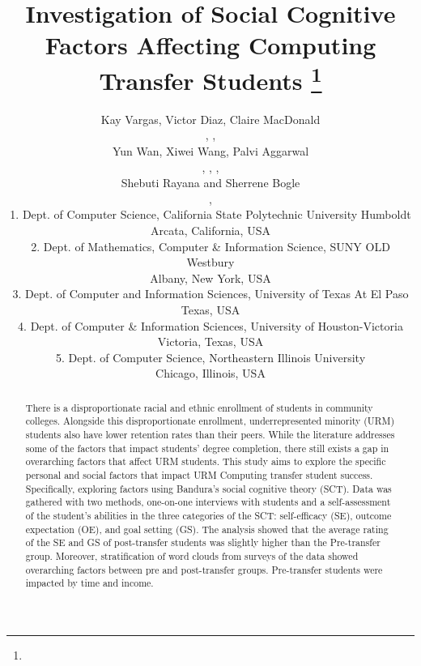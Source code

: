 \documentclass{article}
\title{Investigation of Social Cognitive Factors Affecting Computing Transfer Students
\footnote{\protect}
}
\author{
Kay Vargas\affmark[1],  Victor Diaz\affmark[1],  Claire MacDonald \affmark[3] \\
\email{kv111@humboldt.edu}, \email{vmd21@humboldt.edu}, \email{cemacdonald2@miners.utep.edu}\\
 Yun Wan\affmark[4], Xiwei Wang\affmark[5], Palvi Aggarwal\affmark[3] \\
\email{wany@uhv.edu}, \email{xwang9@neiu.edu}, \email{paggarwal@utep.edu}, \\
 Shebuti Rayana \affmark[2] and Sherrene Bogle \affmark[1]\\ 
\email{rayanas@oldwestbury.edu}, \email{sab30@humboldt.edu}\\
\scriptsize 1. Dept. of Computer Science, 
California State Polytechnic University Humboldt \\ \scriptsize Arcata, California, USA\\
 \scriptsize 2.  Dept. of Mathematics, Computer \& Information Science, SUNY OLD Westbury \\ \scriptsize Albany, New York, USA
 \\
\scriptsize 3. Dept. of Computer and Information Sciences, University of Texas At El Paso \\
\scriptsize Texas, USA\\
\scriptsize 4. Dept. of Computer \& Information Sciences, University of Houston-Victoria \\ 
\scriptsize Victoria, Texas, USA \\
\scriptsize 5. Dept. of Computer Science, Northeastern Illinois University \\
\scriptsize Chicago, Illinois, USA
}
\begin{document}
\maketitle
\begin{abstract}
 There is a disproportionate racial and ethnic enrollment of students in community colleges. %
 Alongside this disproportionate enrollment, underrepresented minority (URM) students also have lower retention rates than their peers. While the literature addresses some of the factors that impact students' degree completion, there still exists a gap in overarching factors that affect URM students. This study aims to explore the specific personal and social factors that impact URM Computing transfer student success. Specifically, exploring factors using Bandura's social cognitive theory (SCT). %
Data was gathered with two methods, one-on-one interviews with students and a self-assessment of the student's abilities in the three categories of the SCT: self-efficacy (SE), outcome expectation (OE), and goal setting (GS). The analysis showed that the average rating of the SE and GS of post-transfer students was slightly higher than the Pre-transfer group. Moreover, stratification of word clouds from surveys of the data showed overarching factors between pre and post-transfer groups. Pre-transfer students were impacted by time and income. 
\end{abstract}
\end{document}
